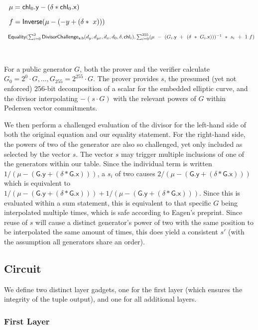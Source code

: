 \documentclass[]{article}
\begin{document}
$~~\mu = \mathsf{chl}_0\mathsf{.y} - (\delta * \mathsf{chl}_0\mathsf{.x})$

$~~f = \mathsf{Inverse}(\mu - (-y + (\delta * ~x)))$

$~~\mathsf{Equality}(\sum^2_{i=0} \mathsf{DivisorChallenge_{a,b}}(d_y, d_{yx}, d_x, d_0, \delta, \mathsf{chl}_i), \sum^{255}_{i=0} (\mu ~-~ (G_i\mathsf{.y} ~+~ (\delta ~*~ G_i\mathsf{.x})))^{-1} ~*~ s_i ~+~ 1 ~f)$

\

For a public generator $G$, both the prover and the verifier calculate $G_0 = 2^0 \cdot G, ..., G_{255} = 2^{255} \cdot G$. The prover provides $s$, the presumed (yet not enforced) 256-bit decomposition of a scalar for the embedded elliptic curve, and the divisor interpolating $-(s \cdot G)$ with the relevant powers of $G$ within Pedersen vector commitments.

We then perform a challenged evaluation of the divisor for the left-hand side of both the original equation and our equality statement. For the right-hand side, the powers of two of the generator are also so challenged, yet only included as selected by the vector $s$. The vector $s$ may trigger multiple inclusions of one of the generators within our table. Since the individual term is written $1 / (\mu - (\mathsf{G.y} + (\delta * \mathsf{G.x})))$, a $s_i$ of two causes $2 / (\mu - (\mathsf{G.y} + (\delta * \mathsf{G.x})))$ which is equivalent to $1 / (\mu - (\mathsf{G.y} + (\delta * \mathsf{G.x}))) + 1 / (\mu - (\mathsf{G.y} + (\delta * \mathsf{G.x})))$. Since this is evaluated within a sum statement, this is equivalent to that specific $G$ being interpolated multiple times, which is safe according to Eagen's preprint. Since reuse of $s$ will cause a distinct generator's power of two with the same position to be interpolated the same amount of times, this does yield a consistent $s'$ (with the assumption all generators share an order).

\newpage

\subsection{Circuit}

We define two distinct layer gadgets, one for the first layer (which ensures the integrity of the tuple output), and one for all additional layers.

\subsubsection{First Layer}
\end{document}

